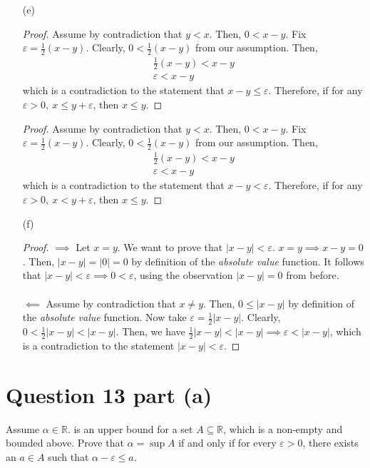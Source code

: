 \message{ !name(Problem_Set_2.tex)}\documentclass[13pt]{article}
\begin{document}
\begin{enumerate}
\item [(e)]
  \begin{proof}
    Assume by contradiction that $y < x$. Then, $0 < x - y$. Fix $\varepsilon = \frac{1}{2}(x - y)$.
    Clearly, $0 < \frac{1}{2}(x - y)$ from our assumption. Then,
    \begin{align*}
      \frac{1}{2}(x - y) < x - y \\
      \varepsilon < x - y
    \end{align*}
    which is a contradiction to the statement that $x - y \leq \varepsilon$. Therefore, if for any
    $\varepsilon > 0, \ x \leq y + \varepsilon$, then $x \leq y$.
  \end{proof}
  \begin{proof}
    Assume by contradiction that $y < x$. Then, $0 < x - y$. Fix $\varepsilon = \frac{1}{2}(x - y)$.
    Clearly, $0 < \frac{1}{2}(x - y)$ from our assumption. Then,
    \begin{align*}
      \frac{1}{2}(x - y) < x - y \\
      \varepsilon < x - y
    \end{align*}
    which is a contradiction to the statement that $x - y < \varepsilon$. Therefore, if for any
    $\varepsilon > 0, \ x < y + \varepsilon$, then $x \leq y$.
  \end{proof}

\item [(f)]
  \begin{proof}
    $\implies$ Let $x = y$. We want to prove that $|x - y| < \varepsilon$. $x = y \implies x - y = 0$.
    Then, $|x - y| = |0| = 0$ by definition of the \textit{absolute value} function. It follows that
    $|x - y| < \varepsilon \implies 0 < \varepsilon$, using the observation $|x - y| = 0$ from before. \\ \\
    $\impliedby$ Assume by contradiction that $x \neq y$. Then, $0 \leq |x - y|$ by definition of the
    \textit{absolute value} function. Now take $\varepsilon = \frac{1}{2}|x - y|$. Clearly, $0 < \frac{1}{2}
    |x - y| < |x - y|$. Then, we have $\frac{1}{2}|x - y| < |x - y| \implies \varepsilon < |x - y|$, which
    is a contradiction to the statement $|x - y| < \varepsilon$.
  \end{proof}
\end{enumerate}

\newpage
\section*{Question 13 part (a)}
Assume $\alpha \in \mathbb{R}$. is an upper bound for a set $A \subseteq \mathbb{R}$, which is a
non-empty and bounded above. Prove that $\alpha = \sup{A}$ if and only if for every $\varepsilon
> 0$, there exists an $a \in A$ such that $\alpha - \varepsilon \leq a$.
\end{document}
